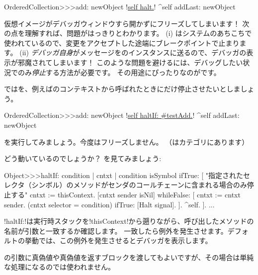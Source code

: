 \documentclass[a4paper,10pt,twoside]{book}
\begin{document}
\begin{code}{}
OrderedCollection>>>add: newObject
	!\underline{self halt.}!
	^self addLast: newObject
\end{code}

仮想イメージがデバッガウィンドウすら開かずにフリーズしてしまいます！
次の点を理解すれば、問題がはっきりとわかります。 (i) はシステムのあちこちで使われているので、変更をアクセプトした途端にブレークポイントで止まります。 (ii) \emph{デバッガ自身}がメッセージをのインスタンスに送るので、デバッガの表示が邪魔されてしまいます！
このような問題を避けるには、デバッグしたい状況でのみ\emph{停止}する方法が必要です。
その用途にぴったりなのがです。

ではを、例えばのコンテキストから呼ばれたときにだけ停止させたいとしましょう。

\begin{code}{}
OrderedCollection>>>add: newObject
	!\underline{self haltIf: \#testAdd.}!
	^self addLast: newObject
\end{code}

を実行してみましょう。今度はフリーズしません。
（はカテゴリにあります）

どう動いているのでしょうか？ を見てみましょう:
\begin{code}{}
Object>>>haltIf: condition
	| cntxt |
	condition isSymbol ifTrue: [
		"指定されたセレクタ（シンボル）のメソッドがセンダのコールチェーンに含まれる場合のみ停止する"
		cntxt := thisContext.
		[cntxt sender isNil] whileFalse: [
			cntxt := cntxt sender. 
			(cntxt selector = condition) ifTrue: [Halt signal]. ].
		^self.
	].
	...
\end{code}

\ct!haltIf:!は実行時スタックを\ct!thisContext!から遡りながら、呼び出したメソッドの名前が引数と一致するか確認します。
一致したら例外を発生させます。デフォルトの挙動では、この例外を発生させるとデバッガを表示します。

の引数に真偽値や真偽値を返すブロックを渡してもよいですが、その場合は単純な処理になるのでは使われません。

\end{document}
